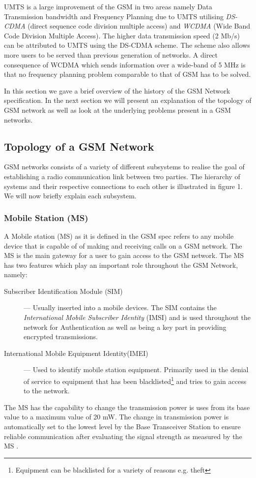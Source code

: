 UMTS is a large improvement of the GSM in two areas namely Data Transmission bandwidth and Frequency Planning due to UMTS utilising \emph{DS-CDMA} (direct sequence code division multiple access) and \emph{WCDMA} (Wide Band Code Division Multiple Access). The higher data transmission speed (2 Mb/s) can be attributed to UMTS using the DS-CDMA scheme. The scheme also allows more users to be served than previous generation of networks. A direct consequence of WCDMA which sends information over a wide-band of 5 MHz is that no frequency planning problem comparable to that of GSM has to be solved\cite{tabuglobalplanning3g,Eisenblatter}.

In this section we gave a brief overview of the history of the GSM Network specification. In the next section we will present an explanation of the topology of GSM network as well as look at the 
underlying problems present in a GSM networks.
\subsection{Topology of a GSM Network}
GSM networks consists of a variety of different subsystems to realise the goal of establishing a radio communication link between two parties. The hierarchy of systems and their respective connections to
each other is illustrated in figure 1. We will now briefly explain each subsystem.
\subsubsection{Mobile Station (MS)}
A Mobile station (MS) as it is defined in the GSM spec refers to any mobile device that is capable of of making and receiving calls on a GSM network.  The MS is the main gateway 
for a user to gain access to the GSM network. The MS has two features which play an important role throughout the GSM Network, namely:
\begin{description}
\item[Subscriber Identification Module (SIM)] --- Usually inserted into a mobile devices. The SIM contains the \emph{International Mobile Subscriber Identity} (IMSI) and is used throughout the network 
for Authentication as well as being a key part in providing encrypted transmissions.
\item[International Mobile Equipment Identity(IMEI)] --- Used to identify mobile station equipment. Primarily used in the denial of service to equipment that has been blacklisted\footnote{Equipment can be blacklisted for a variety of reasons e.g. theft} and tries to gain access to the network.
\end{description}
The MS has the capability to change the transmission power is uses from its base value to a maximum value of 20 mW. The change in transmission power is automatically set to the lowest level by the Base Transceiver Station to ensure reliable communication after evaluating the signal strength as measured by the MS \cite{GSMSysEngin}. %

